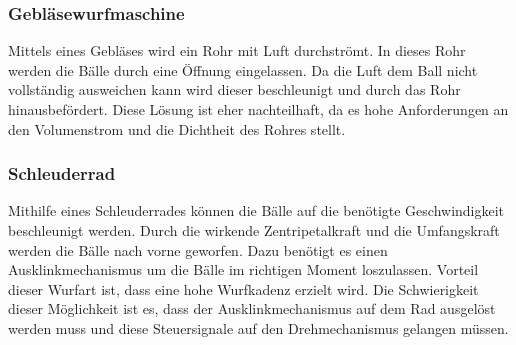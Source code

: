 \subsubsection{Gebläsewurfmaschine}
Mittels eines Gebläses wird ein Rohr mit Luft durchströmt. In dieses Rohr werden die Bälle durch eine Öffnung eingelassen. Da die Luft dem Ball nicht vollständig ausweichen kann wird dieser beschleunigt und durch das Rohr hinausbefördert. Diese Lösung ist eher nachteilhaft, da es hohe Anforderungen an den Volumenstrom und die Dichtheit des Rohres stellt.

\subsubsection{Schleuderrad}
Mithilfe eines Schleuderrades können die Bälle auf die benötigte Geschwindigkeit beschleunigt werden. Durch die wirkende Zentripetalkraft und die Umfangskraft werden die Bälle nach vorne geworfen. Dazu benötigt es einen Ausklinkmechanismus um die Bälle im richtigen Moment loszulassen. Vorteil dieser Wurfart ist, dass eine hohe Wurfkadenz erzielt wird. Die Schwierigkeit dieser Möglichkeit ist es, dass der Ausklinkmechanismus auf dem Rad ausgelöst werden muss und diese Steuersignale auf den Drehmechanismus gelangen müssen.
